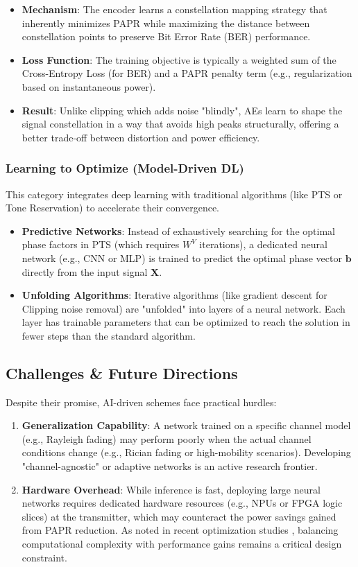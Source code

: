\documentclass[journal]{IEEEtran}
\begin{document}
\begin{itemize}
    \item \textbf{Mechanism}: The encoder learns a constellation mapping strategy that inherently minimizes PAPR while maximizing the distance between constellation points to preserve Bit Error Rate (BER) performance.
    \item \textbf{Loss Function}: The training objective is typically a weighted sum of the Cross-Entropy Loss (for BER) and a PAPR penalty term (e.g., regularization based on instantaneous power).
    \item \textbf{Result}: Unlike clipping which adds noise "blindly", AEs learn to shape the signal constellation in a way that avoids high peaks structurally, offering a better trade-off between distortion and power efficiency.
\end{itemize}

\subsubsection{Learning to Optimize (Model-Driven DL)}
This category integrates deep learning with traditional algorithms (like PTS or Tone Reservation) to accelerate their convergence.

\begin{itemize}
    \item \textbf{Predictive Networks}: Instead of exhaustively searching for the optimal phase factors in PTS (which requires $W^V$ iterations), a dedicated neural network (e.g., CNN or MLP) is trained to predict the optimal phase vector $\mathbf{b}$ directly from the input signal $\mathbf{X}$.
    \item \textbf{Unfolding Algorithms}: Iterative algorithms (like gradient descent for Clipping noise removal) are "unfolded" into layers of a neural network. Each layer has trainable parameters that can be optimized to reach the solution in fewer steps than the standard algorithm.
\end{itemize}

\subsection{Challenges \& Future Directions}
Despite their promise, AI-driven schemes face practical hurdles:

\begin{enumerate}
    \item \textbf{Generalization Capability}: A network trained on a specific channel model (e.g., Rayleigh fading) may perform poorly when the actual channel conditions change (e.g., Rician fading or high-mobility scenarios). Developing "channel-agnostic" or adaptive networks is an active research frontier.
    \item \textbf{Hardware Overhead}: While inference is fast, deploying large neural networks requires dedicated hardware resources (e.g., NPUs or FPGA logic slices) at the transmitter, which may counteract the power savings gained from PAPR reduction. As noted in recent optimization studies \cite{ref4}, balancing computational complexity with performance gains remains a critical design constraint.
\end{enumerate}
\end{document}
